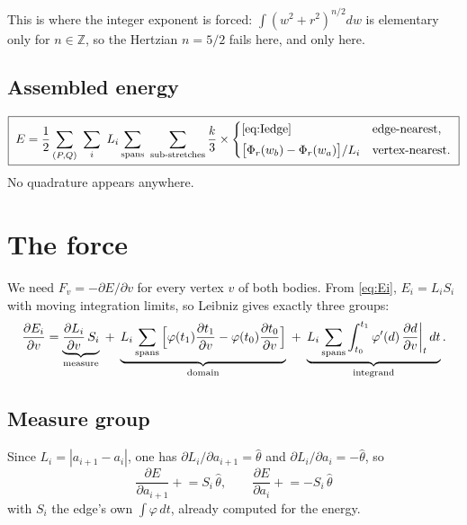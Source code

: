 \documentclass[11pt]{article}
\newcommand{\Z}{\mathbb{Z}}
\newcommand{\that}{\hat\theta}
\begin{document}
This is where the integer exponent is forced: $\int(w^2+r^2)^{n/2}dw$ is elementary only for $n\in\Z$, so the Hertzian $n = 5/2$ fails here, and only here.

\subsection{Assembled energy}

\begin{equation}
\boxed{\;
E = \frac{1}{2}\sum_{(P,Q)}\ \sum_i\ L_i \sum_{\rm spans}\ \sum_{\rm sub\text{-}stretches}
\frac{k}{3}\times
\begin{cases}
\text{\eqref{eq:Iedge}} & \text{edge-nearest},\\[3pt]
\big[\Phi_r(w_b)-\Phi_r(w_a)\big]/L_i & \text{vertex-nearest}.
\end{cases}
\;}
\label{eq:Efinal}
\end{equation}
No quadrature appears anywhere.

\section{The force}
\label{sec:force}

We need $F_v = -\partial E/\partial v$ for every vertex $v$ of both bodies. From \eqref{eq:Ei}, $E_i = L_iS_i$ with moving integration limits, so Leibniz gives exactly three groups:
\begin{equation}
\frac{\partial E_i}{\partial v} =
\underbrace{\frac{\partial L_i}{\partial v}\,S_i}_{\text{measure}}
\;+\; \underbrace{L_i\sum_{\rm spans}\Big[\varphi(t_1)\frac{\partial t_1}{\partial v} - \varphi(t_0)\frac{\partial t_0}{\partial v}\Big]}_{\text{domain}}
\;+\; \underbrace{L_i\sum_{\rm spans}\int_{t_0}^{t_1}\varphi'(d)\,\frac{\partial d}{\partial v}\bigg|_t\,dt}_{\text{integrand}} .
\label{eq:leibniz}
\end{equation}

\subsection{Measure group}

Since $L_i = |a_{i+1}-a_i|$, one has $\partial L_i/\partial a_{i+1} = \that$ and $\partial L_i/\partial a_i = -\that$, so
\begin{equation}
\boxed{\;\frac{\partial E}{\partial a_{i+1}} \mathrel{+}= S_i\,\that, \qquad
\frac{\partial E}{\partial a_i} \mathrel{+}= -S_i\,\that\;}
\label{eq:measure}
\end{equation}
with $S_i$ the edge's own $\int\varphi\,dt$, already computed for the energy.
\end{document}
